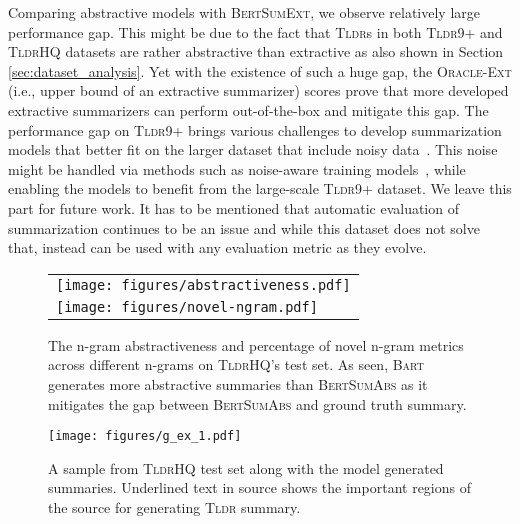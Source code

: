\documentclass[11pt]{article}
\newcommand{\tldrl}{\textsc{Tldr9+}}
\newcommand{\tldrs}{\textsc{TldrHQ}}
\newcommand{\tldr}{\textsc{Tldr}}
\begin{document}
Comparing abstractive models with \textsc{BertSumExt}, we observe relatively large performance gap. This might be due to the fact that \tldr s in both \tldrl{} and \tldrs{} datasets are rather abstractive than extractive as also shown in Section \ref{sec:dataset_analysis}. Yet with the existence of such a huge gap, the \textsc{Oracle-Ext} (i.e., upper bound of an extractive summarizer) scores prove that more developed extractive summarizers can perform out-of-the-box and mitigate this gap. The performance gap on \tldrl{} brings various challenges to develop summarization models that better fit on the larger dataset that include noisy data~\cite{Kumar2020NoisyTD}. This noise might be handled via methods such as noise-aware training models~\cite{Namysl2020NATNT}, while enabling the models to benefit from the large-scale \tldrl{} dataset. We leave this part for future work. It has to be mentioned that automatic evaluation of summarization continues to be an issue and while this dataset does not solve that, instead can be used with any evaluation metric as they evolve. \begin{figure}[h]
    \centering
    
    \begin{tabular}{l}
         \texttt{[image: figures/abstractiveness.pdf]}
         \\
         \texttt{[image: figures/novel-ngram.pdf]}
    \end{tabular}
    
    \caption{The n-gram abstractiveness and percentage of novel n-gram metrics across different n-grams on \tldrs 's test set. As seen, \textsc{Bart} generates more abstractive summaries than \textsc{BertSumAbs} as it mitigates the gap between \textsc{BertSumAbs} and ground truth summary.}
    \label{fig:abstractiveness}
\end{figure}

\begin{figure}[h]
    \centering
    \texttt{[image: figures/g\_ex\_1.pdf]}
    \caption{A sample from \tldrs{} test set along with the model generated summaries. Underlined text in source shows the important regions of the source for generating \tldr{} summary. }
    \label{fig:gen_ex}
\end{figure}
\end{document}
